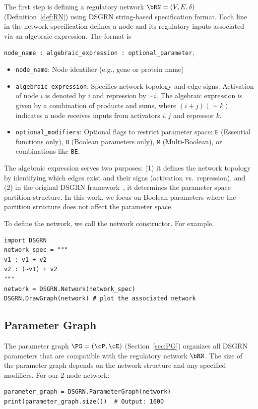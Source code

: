 The first step is defining a regulatory network $\bRN=(V,E,\delta)$ (Definition~\ref{def:RN}) using DSGRN string-based specification format.  Each line in the network specification defines a node and its regulatory inputs associated via an algebraic expression. The format is
\begin{center}
  \texttt{node\_name : algebraic\_expression : optional\_parameter},
\end{center}
\begin{itemize}
  \item \texttt{node\_name}: Node identifier (e.g., gene or protein name)
  \item \texttt{algebraic\_expression}: Specifies network topology and edge signs. Activation of node $i$ is denoted by $i$ and repression by $\sim i$. The algebraic expression is given by a combination of products and sums, where $(i+j)(\sim k)$ indicates a node receives inputs from activators $i,j$ and repressor $k$.
  \item \texttt{optional\_modifiers}: Optional flags to restrict parameter space: \texttt{E} (Essential functions only), \texttt{B} (Boolean parameters only), \texttt{M} (Multi-Boolean), or combinations like \texttt{BE}.
\end{itemize}
\begin{rem}
  The algebraic expression serves two purposes: (1) it defines the network topology by identifying which edges exist and their signs (activation vs.\ repression), and (2) in the original DSGRN framework~\cite{Cummins2017b}, it determines the parameter space partition structure. In this work, we focus on Boolean parameters where the partition structure does not affect the parameter space.
\end{rem}
To define the network, we call the network constructor. For example,
\begin{verbatim}
import DSGRN
network_spec = """
v1 : v1 + v2
v2 : (~v1) + v2
"""
network = DSGRN.Network(network_spec)
DSGRN.DrawGraph(network) # plot the associated network
\end{verbatim}

\subsection{Parameter Graph}

The parameter graph $\PG = (\cP,\cE)$ (Section~\ref{sec:PG}) organizes all DSGRN parameters that are compatible with the regulatory network $\bRN$. The size of the parameter graph depends on the network structure and any specified modifiers. For our 2-node network:
\begin{verbatim}
parameter_graph = DSGRN.ParameterGraph(network)
print(parameter_graph.size())  # Output: 1600
\end{verbatim}

